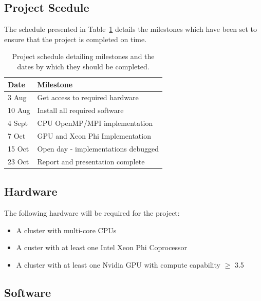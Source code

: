 \documentclass[10pt,twocolumn]{article}
\begin{document}
\subsection{Project Scedule}
The schedule presented in Table~\ref{tab:sched} details the milestones which have been set to ensure that the 
project is completed on time.
\begin{table}[t!]
    \small
    \centering
    \caption{Project schedule detailing milestones and the dates by which they should be completed.}
    \label{tab:sched}
    \vspace{0.2cm}
    \begin{tabular}{l l}
        \hline  
        Date    & Milestone                                                         \\
        \hline
        \hline
        3 Aug   & Get access to required hardware                                   \\
        10 Aug  & Install all required software                                     \\
        4 Sept  & CPU OpenMP/MPI implementation                                     \\
        7 Oct   & GPU and Xeon Phi Implementation                                   \\
        15 Oct  & Open day - implementations debugged                               \\
        23 Oct  & Report and presentation complete                                  \\\hline
    \end{tabular}
\end{table}
\subsection{Hardware} \label{ssec:hware}

The following hardware will be required for the project:
\begin{itemize}[noitemsep]
    \item{A cluster with multi-core CPUs}
    \item{A custer with at least one Intel Xeon Phi Coprocessor}
    \item{A cluster with at least one Nvidia GPU with compute capability $\ge$ 3.5}
\end{itemize}

\subsection{Software} \label{ssec:sware}
\end{document}
